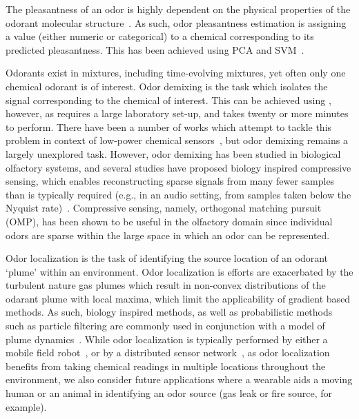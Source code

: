The pleasantness of an odor is highly dependent on the physical properties of
the odorant molecular structure~\cite{arshamian2022perception}. As such, odor
pleasantness estimation is assigning a value (either numeric or categorical) to
a chemical corresponding to its predicted pleasantness.  This has been achieved
using PCA and SVM~\cite{li2018accurate, li2020perception, shang2017machine}.

Odorants exist in mixtures, including time-evolving mixtures, yet often only
one chemical odorant is of interest.  Odor demixing is the task which isolates
the signal corresponding to the chemical of interest.  
This can be achieved
using \gcms{}, however, as \gcms{} requires a large laboratory set-up, and
takes twenty or more minutes to perform. %
There have been a number of works
which attempt to tackle this problem in context of low-power chemical sensors~\cite{maho2021real, victor2014combining,
fonollosa2014chemical}, but odor demixing remains a largely unexplored \olfc{}
task. However, odor demixing has been studied in biological olfactory systems,
and several studies have proposed biology inspired compressive sensing, which
enables reconstructing sparse signals from many fewer samples than is typically
required (e.g., in an audio setting, from samples taken below the Nyquist
rate)~\cite{fornasier2015compressive}. Compressive sensing, namely, orthogonal
matching pursuit (OMP), has been shown to be useful in the olfactory domain
since individual odors are sparse within the large space in which an odor can
be represented.

Odor localization is the task of identifying the source location of an
odorant `plume' within an environment.  Odor localization is efforts are
exacerbated by the turbulent nature gas plumes which result in non-convex
distributions of the odarant plume with local maxima, which limit the
applicability of gradient based methods.  As such, biology inspired methods, as
well as probabilistic methods such as particle filtering are commonly used in
conjunction with a model of plume dynamics~\cite{vickers2000mechanisms}.
While odor localization
is typically performed by either a mobile field robot~\cite{chen2019odor}, or
by a distributed sensor network~\cite{hayes2002distributed}, as odor
localization benefits from taking chemical readings in multiple locations
throughout the environment, we also consider future applications where a
wearable aids a moving human or an animal in identifying an odor source (gas
leak or fire source, for example).


